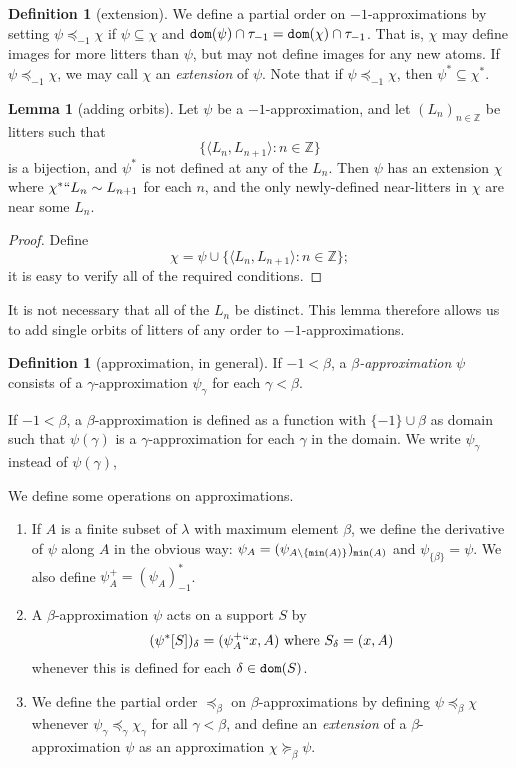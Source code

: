 \documentclass[112pt]{article}
\theoremstyle{definition}
\newtheorem{lemma}[theorem]{Lemma}
\newtheorem{definition}[theorem]{Definition}
\theoremstyle{remark}
\newcommand{\hsuggest}[1]{{\color{magenta}#1}}
\begin{document}
\begin{definition}[extension]
  We define a partial order on $-1$-approximations by setting $\psi \preceq_{-1} \chi$ if $\psi \subseteq \chi$ and ${\tt dom}(\psi) \cap \tau_{-1} = {\tt dom}(\chi) \cap \tau_{-1}$.
  That is, $\chi$ may define images for more litters than $\psi$, but may not define images for any new atoms.
  If $\psi \preceq_{-1} \chi$, we may call $\chi$ an {\em extension\/} of $\psi$.
  Note that if $\psi \preceq_{-1} \chi$, then $\psi^* \subseteq \chi^*$.
\end{definition}
\begin{lemma}[adding orbits]\label{lem:add_orbits}
  Let $\psi$ be a $-1$-approximation, and let $(L_n)_{n \in \mathbb Z}$ be litters such that $$\{ \langle L_n, L_{n+1} \rangle : n \in \mathbb Z \}$$ is a bijection, and $\psi^*$ is not defined at any of the $L_n$.
  Then $\psi$ has an extension $\chi$ where $\chi^* `` L_n \sim L_{n+1}$ for each $n$, and the only newly-defined near-litters in $\chi$ are near some $L_n$.
\end{lemma}
\begin{proof}
  Define
  $$ \chi = \psi \cup \{ \langle L_n, L_{n+1} \rangle : n \in \mathbb Z \}; $$
  it is easy to verify all of the required conditions.
\end{proof}
It is not necessary that all of the $L_n$ be distinct.
This lemma therefore allows us to add single orbits of litters of any order to $-1$-approximations.
\begin{definition}[approximation, in general]\label{def:approx}
  If $-1 < \beta$, a {\em $\beta$-approximation\/} $\psi$ consists of a $\gamma$-approximation $\psi_\gamma$ for each $\gamma < \beta$.  

\hsuggest{If $-1 < \beta$, a $\beta$-approximation is defined as a function with $\{-1\} \cup \beta$ as domain such that $\psi(\gamma)$ is a $\gamma$-approximation for each $\gamma$ in the domain.  We write $\psi_\gamma$ instead of $\psi(\gamma)$,}


  We define some operations on approximations.
  \begin{enumerate}
    \item If $A$ is a finite subset of $\lambda$ with maximum element $\beta$, we define the derivative of $\psi$ along $A$ in the obvious way: $\psi_A = (\psi_{A \setminus \{{\tt min}(A)\}})_{{\tt min}(A)}$ and $\psi_{\{\beta\}} = \psi$.
    We also define $\psi_A^+ = (\psi_A)_{-1}^*$.
    \item A $\beta$-approximation $\psi$ acts on a support $S$ by
    $$ (\psi^*[S])_\delta = (\psi_A^+ `` x, A) \ \mathrm{where}\ S_\delta = (x, A) $$
    whenever this is defined for each $\delta \in {\tt dom}(S)$.
    \item We define the partial order $\preceq_\beta$ on $\beta$-approximations by defining $\psi \preceq_\beta \chi$ whenever $\psi_\gamma \preceq_\gamma \chi_\gamma$ for all $\gamma < \beta$, and define an {\em extension\/} of a $\beta$-approximation $\psi$ as an approximation $\chi \succeq_\beta \psi$.
  \end{enumerate}
\end{definition}
\end{document}
